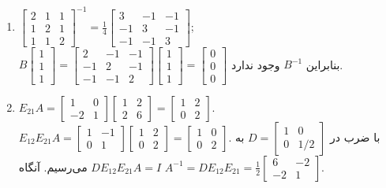 \documentclass[12pt,a4paper]{article}
\begin{document}
{\begin{enumerate}
			\item $\begin{bmatrix} 2 & 1 & 1 \\ 1 & 2 & 1 \\ 1 & 1 & 2 \end{bmatrix}^{-1} = \frac{1}{4}\begin{bmatrix} 3 & -1 & -1 \\ -1 & 3 & -1 \\ -1 & -1 & 3 \end{bmatrix}$; $B \begin{bmatrix} 1\\1\\1 \end{bmatrix} = \begin{bmatrix} 2 & -1 & -1 \\ -1 & 2 & -1 \\ -1 & -1 & 2 \end{bmatrix} \begin{bmatrix} 1\\1\\1 \end{bmatrix} = \begin{bmatrix} 0\\0\\0 \end{bmatrix}$ بنابراین $B^{-1}$ وجود ندارد.
			
			\item $E_{21}A = \begin{bmatrix} 1 & 0 \\ -2 & 1 \end{bmatrix} \begin{bmatrix} 1 & 2 \\ 2 & 6 \end{bmatrix} = \begin{bmatrix} 1 & 2 \\ 0 & 2 \end{bmatrix}$. $E_{12}E_{21}A = \begin{bmatrix} 1 & -1 \\ 0 & 1 \end{bmatrix} \begin{bmatrix} 1 & 2 \\ 0 & 2 \end{bmatrix} = \begin{bmatrix} 1 & 0 \\ 0 & 2 \end{bmatrix}$. با ضرب در $D=\begin{bmatrix} 1 & 0 \\ 0 & 1/2 \end{bmatrix}$ به $DE_{12}E_{21}A=I$ می‌رسیم. آنگاه $A^{-1} = DE_{12}E_{21} = \frac{1}{2}\begin{bmatrix} 6 & -2 \\ -2 & 1 \end{bmatrix}$.
			

\end{enumerate}}
\end{document}
